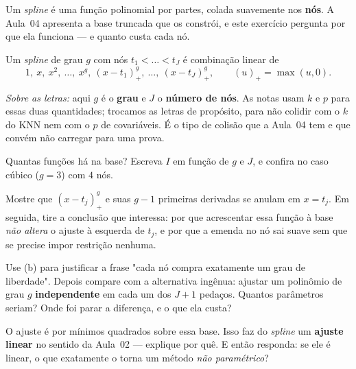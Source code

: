 Um \emph{spline} é uma função polinomial por partes, colada suavemente nos
\textbf{nós}. A Aula~04 apresenta a base truncada que os constrói, e este
exercício pergunta por que ela funciona --- e quanto custa cada nó.

Um \emph{spline} de grau $g$ com nós $t_1<\dots<t_J$ é combinação linear de
\[
  1,\ x,\ x^2,\ \dots,\ x^{g},\
  (x-t_1)_+^{g},\ \dots,\ (x-t_J)_+^{g},
  \qquad (u)_+=\max(u,0).
\]

\emph{Sobre as letras:} aqui $g$ é o \textbf{grau} e $J$ o \textbf{número de
nós}. As notas usam $k$ e $p$ para essas duas quantidades; trocamos as letras de
propósito, para não colidir com o $k$ do KNN nem com o $p$ de covariáveis. É o
tipo de colisão que a Aula~04 tem e que convém não carregar para uma prova.
\begin{itens}
  \item {} Quantas funções há na base? Escreva $I$ em função de $g$ e $J$,
        e confira no caso cúbico ($g=3$) com $4$ nós.
  \item {} Mostre que $(x-t_j)_+^{g}$ e suas $g-1$ primeiras derivadas se
        anulam em $x=t_j$. Em seguida, tire a conclusão que interessa: por que
        acrescentar essa função à base \emph{não altera} o ajuste à esquerda de
        $t_j$, e por que a emenda no nó sai suave sem que se precise impor
        restrição nenhuma.
  \item {} Use (b) para justificar a frase "cada nó compra exatamente um
        grau de liberdade". Depois compare com a alternativa ingênua: ajustar um
        polinômio de grau $g$ \textbf{independente} em cada um dos $J+1$ pedaços.
        Quantos parâmetros seriam? Onde foi parar a diferença, e o que ela custa?
  \item \pts{0,9} O ajuste é por mínimos quadrados sobre essa base. Isso faz do
        \emph{spline} um \textbf{ajuste linear} no sentido da Aula~02 --- explique
        por quê. E então responda: se ele é linear, o que exatamente o torna um
        método \emph{não paramétrico}?
\end{itens}

